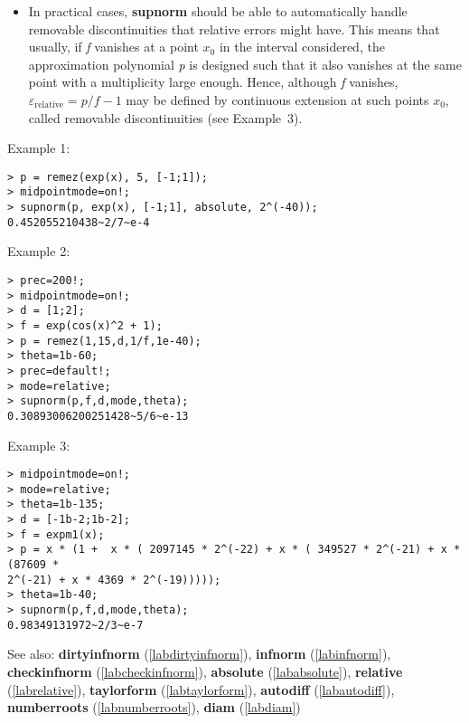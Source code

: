 \begin{itemize}
\item In practical cases, \textbf{supnorm} should be able to automatically handle
   removable discontinuities that relative errors might have. This means
   that usually, if \emph{f} vanishes at a point $x_0$ in the interval
   considered, the approximation polynomial \emph{p} is designed such that it
   also vanishes at the same point with a multiplicity large
   enough. Hence, although \emph{f} vanishes, 
   $\varepsilon_{\textrm{relative}}=p/f-1$ may be 
   defined by continuous extension at such points $x_0$, called 
   removable discontinuities (see Example~$3$).
\end{itemize}
\noindent Example 1: 
\begin{center}\begin{minipage}{15cm}\begin{Verbatim}[frame=single]
> p = remez(exp(x), 5, [-1;1]);
> midpointmode=on!;
> supnorm(p, exp(x), [-1;1], absolute, 2^(-40));
0.452055210438~2/7~e-4
\end{Verbatim}
\end{minipage}\end{center}
\noindent Example 2: 
\begin{center}\begin{minipage}{15cm}\begin{Verbatim}[frame=single]
> prec=200!;
> midpointmode=on!;
> d = [1;2];
> f = exp(cos(x)^2 + 1);
> p = remez(1,15,d,1/f,1e-40);
> theta=1b-60;
> prec=default!;
> mode=relative;
> supnorm(p,f,d,mode,theta);
0.30893006200251428~5/6~e-13
\end{Verbatim}
\end{minipage}\end{center}
\noindent Example 3: 
\begin{center}\begin{minipage}{15cm}\begin{Verbatim}[frame=single]
> midpointmode=on!;
> mode=relative;
> theta=1b-135;
> d = [-1b-2;1b-2];
> f = expm1(x);
> p = x * (1 +  x * ( 2097145 * 2^(-22) + x * ( 349527 * 2^(-21) + x * (87609 * 
2^(-21) + x * 4369 * 2^(-19))))); 
> theta=1b-40;
> supnorm(p,f,d,mode,theta);
0.98349131972~2/3~e-7
\end{Verbatim}
\end{minipage}\end{center}
See also: \textbf{dirtyinfnorm} (\ref{labdirtyinfnorm}), \textbf{infnorm} (\ref{labinfnorm}), \textbf{checkinfnorm} (\ref{labcheckinfnorm}), \textbf{absolute} (\ref{lababsolute}), \textbf{relative} (\ref{labrelative}), \textbf{taylorform} (\ref{labtaylorform}), \textbf{autodiff} (\ref{labautodiff}), \textbf{numberroots} (\ref{labnumberroots}), \textbf{diam} (\ref{labdiam})
